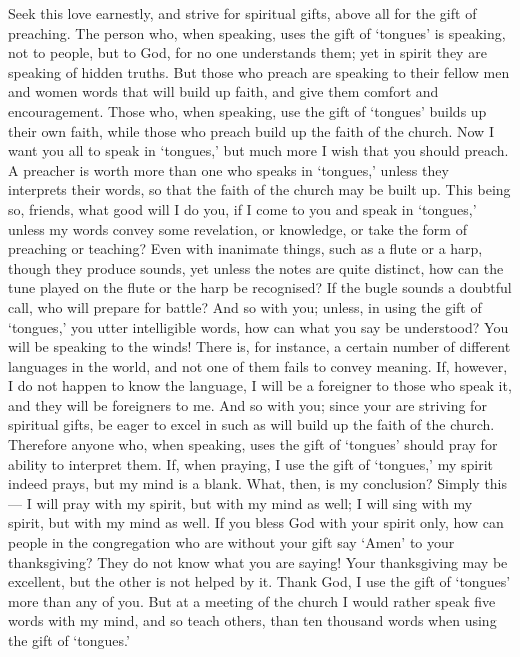  Seek this love earnestly, and strive for spiritual gifts,
above all for the gift of preaching.  The person who, when
speaking, uses the gift of `tongues' is speaking, not to people, but to
God, for no one understands them; yet in spirit they are speaking of
hidden truths.  But those who preach are speaking to their
fellow men and women words that will build up faith, and give them
comfort and encouragement.  Those who, when speaking, use
the gift of `tongues' builds up their own faith, while those who preach
build up the faith of the church.  Now I want you all to
speak in `tongues,' but much more I wish that you should preach. A
preacher is worth more than one who speaks in `tongues,' unless they
interprets their words, so that the faith of the church may be built up.
 This being so, friends, what good will I do you, if I come
to you and speak in `tongues,' unless my words convey some revelation,
or knowledge, or take the form of preaching or teaching? 
Even with inanimate things, such as a flute or a harp, though they
produce sounds, yet unless the notes are quite distinct, how can the
tune played on the flute or the harp be recognised?  If the
bugle sounds a doubtful call, who will prepare for battle? 
And so with you; unless, in using the gift of `tongues,' you utter
intelligible words, how can what you say be understood? You will be
speaking to the winds!  There is, for instance, a certain
number of different languages in the world, and not one of them fails to
convey meaning.  If, however, I do not happen to know the
language, I will be a foreigner to those who speak it, and they will be
foreigners to me.  And so with you; since your are striving
for spiritual gifts, be eager to excel in such as will build up the
faith of the church.  Therefore anyone who, when speaking,
uses the gift of `tongues' should pray for ability to interpret them.
 If, when praying, I use the gift of `tongues,' my spirit
indeed prays, but my mind is a blank.  What, then, is my
conclusion? Simply this --- I will pray with my spirit, but with my mind
as well; I will sing with my spirit, but with my mind as well.
 If you bless God with your spirit only, how can people in
the congregation who are without your gift say `Amen' to your
thanksgiving? They do not know what you are saying!  Your
thanksgiving may be excellent, but the other is not helped by it.
 Thank God, I use the gift of `tongues' more than any of
you.  But at a meeting of the church I would rather speak
five words with my mind, and so teach others, than ten thousand words
when using the gift of `tongues.'

